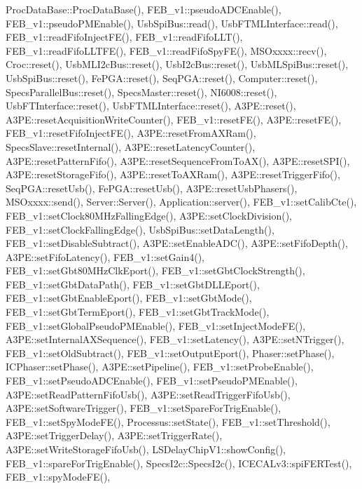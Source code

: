 Proc\+Data\+Base\+::\+Proc\+Data\+Base(), F\+E\+B\+\_\+v1\+::pseudo\+A\+D\+C\+Enable(), F\+E\+B\+\_\+v1\+::pseudo\+P\+M\+Enable(), Usb\+Spi\+Bus\+::read(), Usb\+F\+T\+M\+L\+Interface\+::read(), F\+E\+B\+\_\+v1\+::read\+Fifo\+Inject\+F\+E(), F\+E\+B\+\_\+v1\+::read\+Fifo\+L\+L\+T(), F\+E\+B\+\_\+v1\+::read\+Fifo\+L\+L\+T\+F\+E(), F\+E\+B\+\_\+v1\+::read\+Fifo\+Spy\+F\+E(), M\+S\+Oxxxx\+::recv(), Croc\+::reset(), Usb\+M\+L\+I2c\+Bus\+::reset(), Usb\+I2c\+Bus\+::reset(), Usb\+M\+L\+Spi\+Bus\+::reset(), Usb\+Spi\+Bus\+::reset(), Fe\+P\+G\+A\+::reset(), Seq\+P\+G\+A\+::reset(), Computer\+::reset(), Specs\+Parallel\+Bus\+::reset(), Specs\+Master\+::reset(), N\+I6008\+::reset(), Usb\+F\+T\+Interface\+::reset(), Usb\+F\+T\+M\+L\+Interface\+::reset(), A3\+P\+E\+::reset(), A3\+P\+E\+::reset\+Acquisition\+Write\+Counter(), F\+E\+B\+\_\+v1\+::reset\+F\+E(), A3\+P\+E\+::reset\+F\+E(), F\+E\+B\+\_\+v1\+::reset\+Fifo\+Inject\+F\+E(), A3\+P\+E\+::reset\+From\+A\+X\+Ram(), Specs\+Slave\+::reset\+Internal(), A3\+P\+E\+::reset\+Latency\+Counter(), A3\+P\+E\+::reset\+Pattern\+Fifo(), A3\+P\+E\+::reset\+Sequence\+From\+To\+A\+X(), A3\+P\+E\+::reset\+S\+P\+I(), A3\+P\+E\+::reset\+Storage\+Fifo(), A3\+P\+E\+::reset\+To\+A\+X\+Ram(), A3\+P\+E\+::reset\+Trigger\+Fifo(), Seq\+P\+G\+A\+::reset\+Usb(), Fe\+P\+G\+A\+::reset\+Usb(), A3\+P\+E\+::reset\+Usb\+Phasers(), M\+S\+Oxxxx\+::send(), Server\+::\+Server(), Application\+::server(), F\+E\+B\+\_\+v1\+::set\+Calib\+Cte(), F\+E\+B\+\_\+v1\+::set\+Clock80\+M\+Hz\+Falling\+Edge(), A3\+P\+E\+::set\+Clock\+Division(), F\+E\+B\+\_\+v1\+::set\+Clock\+Falling\+Edge(), Usb\+Spi\+Bus\+::set\+Data\+Length(), F\+E\+B\+\_\+v1\+::set\+Disable\+Subtract(), A3\+P\+E\+::set\+Enable\+A\+D\+C(), A3\+P\+E\+::set\+Fifo\+Depth(), A3\+P\+E\+::set\+Fifo\+Latency(), F\+E\+B\+\_\+v1\+::set\+Gain4(), F\+E\+B\+\_\+v1\+::set\+Gbt80\+M\+Hz\+Clk\+Eport(), F\+E\+B\+\_\+v1\+::set\+Gbt\+Clock\+Strength(), F\+E\+B\+\_\+v1\+::set\+Gbt\+Data\+Path(), F\+E\+B\+\_\+v1\+::set\+Gbt\+D\+L\+L\+Eport(), F\+E\+B\+\_\+v1\+::set\+Gbt\+Enable\+Eport(), F\+E\+B\+\_\+v1\+::set\+Gbt\+Mode(), F\+E\+B\+\_\+v1\+::set\+Gbt\+Term\+Eport(), F\+E\+B\+\_\+v1\+::set\+Gbt\+Track\+Mode(), F\+E\+B\+\_\+v1\+::set\+Global\+Pseudo\+P\+M\+Enable(), F\+E\+B\+\_\+v1\+::set\+Inject\+Mode\+F\+E(), A3\+P\+E\+::set\+Internal\+A\+X\+Sequence(), F\+E\+B\+\_\+v1\+::set\+Latency(), A3\+P\+E\+::set\+N\+Trigger(), F\+E\+B\+\_\+v1\+::set\+Old\+Subtract(), F\+E\+B\+\_\+v1\+::set\+Output\+Eport(), Phaser\+::set\+Phase(), I\+C\+Phaser\+::set\+Phase(), A3\+P\+E\+::set\+Pipeline(), F\+E\+B\+\_\+v1\+::set\+Probe\+Enable(), F\+E\+B\+\_\+v1\+::set\+Pseudo\+A\+D\+C\+Enable(), F\+E\+B\+\_\+v1\+::set\+Pseudo\+P\+M\+Enable(), A3\+P\+E\+::set\+Read\+Pattern\+Fifo\+Usb(), A3\+P\+E\+::set\+Read\+Trigger\+Fifo\+Usb(), A3\+P\+E\+::set\+Software\+Trigger(), F\+E\+B\+\_\+v1\+::set\+Spare\+For\+Trig\+Enable(), F\+E\+B\+\_\+v1\+::set\+Spy\+Mode\+F\+E(), Processus\+::set\+State(), F\+E\+B\+\_\+v1\+::set\+Threshold(), A3\+P\+E\+::set\+Trigger\+Delay(), A3\+P\+E\+::set\+Trigger\+Rate(), A3\+P\+E\+::set\+Write\+Storage\+Fifo\+Usb(), L\+S\+Delay\+Chip\+V1\+::show\+Config(), F\+E\+B\+\_\+v1\+::spare\+For\+Trig\+Enable(), Specs\+I2c\+::\+Specs\+I2c(), I\+C\+E\+C\+A\+Lv3\+::spi\+F\+E\+R\+Test(), F\+E\+B\+\_\+v1\+::spy\+Mode\+F\+E(), 